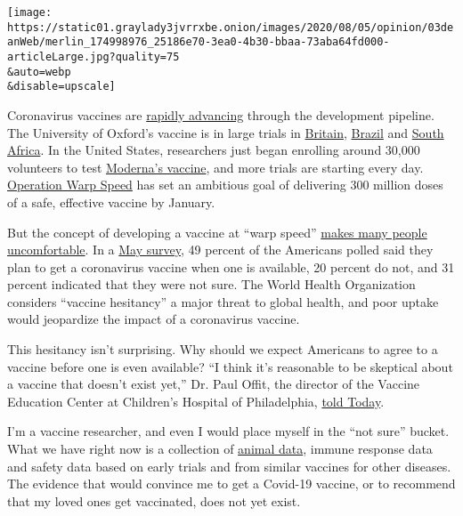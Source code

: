 \texttt{[image: https://static01.graylady3jvrrxbe.onion/images/2020/08/05/opinion/03deanWeb/merlin\_174998976\_25186e70-3ea0-4b30-bbaa-73aba64fd000-articleLarge.jpg?quality=75\\\&auto=webp\\\&disable=upscale]}

Coronavirus vaccines are
\href{https://www.nytimes3xbfgragh.onion/interactive/2020/science/coronavirus-vaccine-tracker.html}{rapidly
advancing} through the development pipeline. The University of Oxford's
vaccine is in large trials in
\href{https://www.ox.ac.uk/news/2020-05-22-oxford-covid-19-vaccine-begin-phase-iiiii-human-trials}{Britain},
\href{https://www.ox.ac.uk/news/2020-06-28-trial-oxford-covid-19-vaccine-starts-brazil}{Brazil}
and
\href{https://www.ovg.ox.ac.uk/news/trial-of-oxford-covid-19-vaccine-in-south-africa-begins}{South
Africa}. In the United States, researchers just began enrolling around
30,000 volunteers to test
\href{https://www.nih.gov/news-events/news-releases/phase-3-clinical-trial-investigational-vaccine-covid-19-begins}{Moderna's
vaccine}, and more trials are starting every day.
\href{https://www.hhs.gov/about/news/2020/06/16/fact-sheet-explaining-operation-warp-speed.html}{Operation
Warp Speed} has set an ambitious goal of delivering 300 million doses of
a safe, effective vaccine by January.

But the concept of developing a vaccine at ``warp speed''
\href{https://www.nytimes3xbfgragh.onion/2020/07/18/health/coronavirus-anti-vaccine.html}{makes
many people uncomfortable}. In a
\href{https://apnorc.org/projects/expectations-for-a-covid-19-vaccine/}{May
survey}, 49 percent of the Americans polled said they plan to get a
coronavirus vaccine when one is available, 20 percent do not, and 31
percent indicated that they were not sure. The World Health Organization
considers ``vaccine hesitancy'' a major threat to global health, and
poor uptake would jeopardize the impact of a coronavirus vaccine.

This hesitancy isn't surprising. Why should we expect Americans to agree
to a vaccine before one is even available? ``I think it's reasonable to
be skeptical about a vaccine that doesn't exist yet,'' Dr. Paul Offit,
the director of the Vaccine Education Center at Children's Hospital of
Philadelphia,
\href{https://www.today.com/health/when-will-vaccine-be-ready-covid-19-speed-causes-safety-t187727}{told
Today}.

I'm a vaccine researcher, and even I would place myself in the ``not
sure'' bucket. What we have right now is a collection of
\href{https://news.harvard.edu/gazette/story/2020/05/vaccines-found-that-may-protect-against-covid-19-in-animal-models/}{animal
data}, immune response data and safety data based on early trials and
from similar vaccines for other diseases. The evidence that would
convince me to get a Covid-19 vaccine, or to recommend that my loved
ones get vaccinated, does not yet exist.

